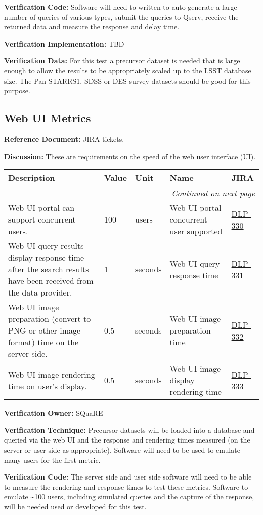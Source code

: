 \documentclass[DM,lsstdraft,toc]{lsstdoc}
\makeatletter
\newcommand{\jira}[1]{\href{https://jira.lsstcorp.org/browse/#1}{#1}}
\newenvironment{metric}[0]{%
\setlength\LTleft{0pt}
\setlength\LTright{\fill}
\begin{longtable}[]{@{}p{0.4\textwidth}lp{0.75in}p{1.3in}p{0.75in}@{}}

\hline \textbf{Description} & \textbf{Value} & \textbf{Unit} & \textbf{Name} & \textbf{JIRA} \\ \hline
\endhead

\hline \multicolumn{5}{r}{\emph{Continued on next page}} \\
\endfoot

\hline\hline
\endlastfoot
}{%
\hline
\end{longtable}
}
\makeatother
\begin{document}
\textbf{Verification Code:} Software will need to written to
auto-generate a large number of queries of various types, submit the
queries to Qserv, receive the returned data and measure the response and
delay time.

\textbf{Verification Implementation:} TBD

\textbf{Verification Data:} For this test a precursor dataset is needed
that is large enough to allow the results to be appropriately scaled up
to the LSST database size. The Pan-STARRS1, SDSS or DES survey datasets
should be good for this purpose.

\subsection{Web UI Metrics}\label{web-ui-metrics}

\textbf{Reference Document:} JIRA tickets.

\textbf{Discussion:} These are requirements on the speed of the web user
interface (UI).

\begin{metric}
Web UI portal can support concurrent users. & 100 & users & Web UI
portal concurrent user supported & \jira{DLP-330}\tabularnewline
Web UI query results display response time after the search results have
been received from the data provider. & 1 & seconds & Web UI query
response time & \jira{DLP-331}\tabularnewline
Web UI image preparation (convert to PNG or other image format) time on
the server side. & 0.5 & seconds & Web UI image preparation time &
\jira{DLP-332}\tabularnewline
Web UI image rendering time on user's display. & 0.5 & seconds & Web UI
image display rendering time & \jira{DLP-333}\tabularnewline
\end{metric}

\textbf{Verification Owner:} SQuaRE

\textbf{Verification Technique:} Precursor datasets will be loaded into
a database and queried via the web UI and the response and rendering
times measured (on the server or user side as appropriate). Software
will need to be used to emulate many users for the first metric.

\textbf{Verification Code:} The server side and user side software will
need to be able to measure the rendering and response times to test
these metrics. Software to emulate \textasciitilde{}100 users, including
simulated queries and the capture of the response, will be needed used
or developed for this test.
\end{document}
